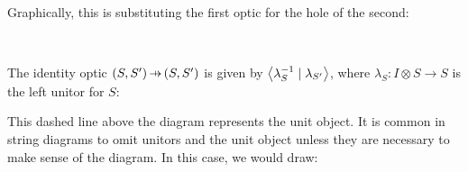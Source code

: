 \documentclass[11pt,a4paper]{article}
\theoremstyle{plain}
\theoremstyle{definition}
\newcommand{\rep}[2]{{\ensuremath \left\langle #1 \mid #2 \right\rangle}}
\newcommand{\hto}{\ensuremath{\,\mathaccent\shortmid\rightarrow\,}}
\begin{document}
Graphically, this is substituting the first optic for the hole of the second:
\begin{center}
  
  \qquad\raisebox{1.5cm}{$\circ$}\qquad
   \\
  \raisebox{1.5cm}{$:=$}\qquad
  
\end{center}

The identity optic $(S, S') \hto (S, S')$ is given by $\rep{\lambda^{-1}_S}{\lambda_{S'}}$, where $\lambda_S : I \otimes S \to S$ is the left unitor for $S$:
\begin{center}
  
\end{center}
This dashed line above the diagram represents the unit object. It is common in string diagrams to omit unitors and the unit object unless they are necessary to make sense of the diagram. In this case, we would draw:
\begin{center}
  
\end{center}
\end{document}
